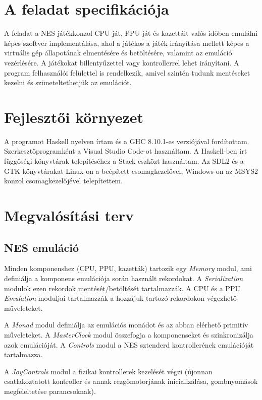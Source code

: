 \section{A feladat specifikációja}

A feladat a NES játékkonzol CPU-ját, PPU-ját és kazettáit valós időben emulálni képes szoftver implementálása, ahol a játékos a játék irányítása mellett képes a virtuális gép állapotának elmentésére és betöltésére, valamint az emuláció vezérlésére. A játékokat billentyűzettel vagy kontrollerrel lehet irányítani. A program felhasználói felülettel is rendelkezik, amivel szintén tudunk mentéseket kezelni és szüneteltethetjük az emulációt.

\section{Fejlesztői környezet}

A programot Haskell nyelven írtam és a GHC 8.10.1-es verziójával fordítottam. Szerkesztőprogramként a Visual Studio Code-ot használtam. A Haskell-ben írt függőségi könyvtárak telepítéséhez a Stack eszközt használtam.
Az SDL2 és a GTK könyvtárakat Linux-on a beépített csomagkezelővel, Windows-on az MSYS2 konzol csomagkezelőjével telepítettem.

\section{Megvalósítási terv}

\subsection{NES emuláció}

Minden komponenshez (CPU, PPU, kazetták) tartozik egy \emph{Memory} modul, ami definiálja a komponens emulációja során használt rekordokat. A \emph{Serialization} modulok ezen rekordok mentését/betöltését tartalmazzák. A CPU és a PPU \emph{Emulation} moduljai tartalmazzák a hozzájuk tartozó rekordokon végezhető műveleteket.

A \emph{Monad} modul definiálja az emulációs monádot és az abban elérhető primitív műveleteket.
A \emph{MasterClock} modul összefogja a komponenseket és szinkronizálja azok emulációját.
A \emph{Controls} modul a NES sztenderd kontrollerének emulációját tartalmazza.   

A \emph{JoyControls} modul a fizikai kontrollerek kezelését végzi (újonnan csatlakoztatott kontroller és annak rezgőmotorjának inicializálása, gombnyomások megfeleltetése parancsoknak).

